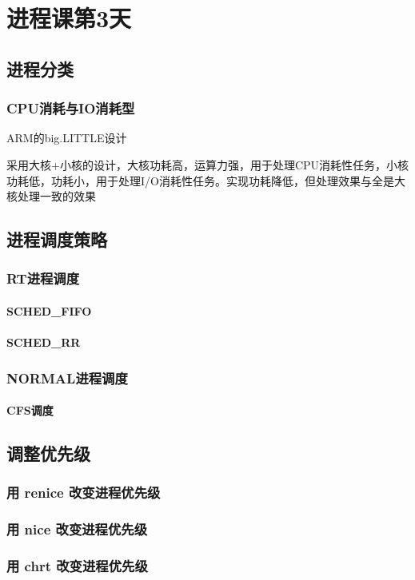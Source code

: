 


\part{进程课第3天}
\chapter{进程分类}
 \section{CPU消耗与IO消耗型}
\begin{example*}
  \wdexpbox
  {\caption{ARM的big.LITTLE设计}}
  {采用大核+小核的设计，大核功耗高，运算力强，用于处理CPU消耗性任务，小核功耗低，功耗小，用于处理I/O消耗性任务。实现功耗降低，但处理效果与全是大核处理一致的效果}
\end{example*}

\chapter{进程调度策略}
\section{RT进程调度}
\subsection{SCHED\_FIFO}
\subsection{SCHED\_RR}


\section{NORMAL进程调度}
\subsection{CFS调度}
\clearpage


\chapter{调整优先级}
\section{用 renice 改变进程优先级}
\section{用 nice 改变进程优先级}
\section{用 chrt 改变进程优先级}
\clearpage
